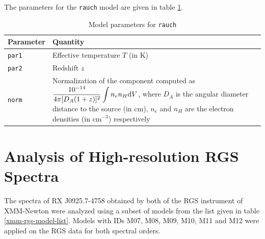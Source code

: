 				The parameters for the \texttt{rauch} model are given in table \ref{param:rauch}.
				\begin{table}[h!]
					\centering
					\caption{Model parameters for \texttt{rauch}}
					\label{param:rauch}
					\begin{tabular}{p{}p{}}
						\hline
						\textbf{Parameter} & \textbf{Quantity} \\ \hline
						{\texttt{par1}} & {Effective temperature $T$ (in K)} \\ %
						{\texttt{par2}} & {Redshift $z$} \\ %
						{\texttt{norm}} & {Normalization of the component computed as $\displaystyle\dfrac{10^{-14}}{4\pi[D_A(1+z)]^2}\int{n_en_H\mathrm{d}V}$, where $D_A$ is the angular diameter distance to the source (in cm), $n_e$ and $n_H$ are the electron densities (in cm$^{-3}$) respectively} \\ \hline
					\end{tabular}
				\end{table}
	
	\section{Analysis of High-resolution RGS Spectra} \label{hi-resolution:analysis}
		The spectra of RX J0925.7-4758 obtained by both of the RGS instrument of XMM-Newton were analyzed using a subset of models from the list given in table \ref{xmm-rgs-model-list}. Models with IDs M07, M08, M09, M10, M11 and M12 were applied on the RGS data for both spectral orders.
		
